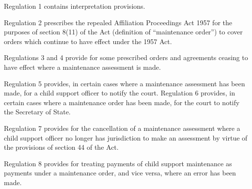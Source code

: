 \documentclass[12pt,a4paper]{article}
\begin{document}
  Regulation 1 contains interpretation provisions.

  Regulation 2 prescribes the repealed Affiliation Proceedings Act 1957 for the purposes of section 8(11) of the Act (definition of “maintenance order”) to cover orders which continue to have effect under the 1957 Act.

  Regulations 3 and 4 provide for some prescribed orders and agreements ceasing to have effect where a maintenance assessment is made.

  Regulation 5 provides, in certain cases where a maintenance assessment has been made, for a child support officer to notify the court. Regulation 6 provides, in certain cases where a maintenance order has been made, for the court to notify the Secretary of State.

  Regulation 7 provides for the cancellation of a maintenance assessment where a child support officer no longer has jurisdiction to make an assessment by virtue of the provisions of section 44 of the Act.

  Regulation 8 provides for treating payments of child support maintenance as payments under a maintenance order, and vice versa, where an error has been made.
\end{document}

